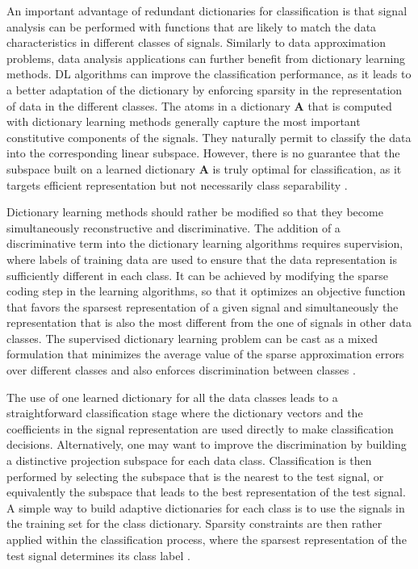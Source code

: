 An important advantage of redundant dictionaries for classification is that signal analysis can be performed with functions that are likely to match the data characteristics in different classes of signals. Similarly to data approximation problems, data analysis applications can further benefit from dictionary learning methods. DL algorithms can improve the classification performance, as it leads to a better adaptation of the dictionary by enforcing sparsity in the representation of data in the different classes. The atoms in a dictionary $\textbf{A}$ that is computed with dictionary learning methods generally capture the most important constitutive components of the signals. They naturally permit to classify the data into the corresponding linear subspace. However, there is no guarantee that the subspace built on a learned dictionary $\textbf{A}$ is truly optimal for classification, as it targets efficient representation but not necessarily class separability \cite{tosic2011dictionary}.

Dictionary learning methods should rather be modified so that they become simultaneously reconstructive and discriminative. The addition of a discriminative term into the dictionary learning algorithms requires supervision, where labels of training data are used to ensure that the data representation is sufficiently different in each class. It can be achieved by modifying the sparse coding step in the learning algorithms, so that it optimizes an objective function that favors the sparsest representation of a given signal and simultaneously the representation that is also the most different from the one of signals in other data classes. The supervised dictionary learning problem can be cast as a mixed formulation that minimizes the average value of the sparse approximation errors over different classes and also enforces discrimination between classes \cite{tosic2011dictionary}.

The use of one learned dictionary for all the data classes leads to a straightforward classification stage where the dictionary vectors and the coefficients in the signal representation are used directly to make classification decisions. Alternatively, one may want to improve the discrimination by building a distinctive projection subspace for each data class. Classification is then performed by selecting the subspace that is the nearest to the test signal, or equivalently the subspace that leads to the best representation of the test signal. A simple way to build adaptive dictionaries for each class is to use the signals in the training set for the class dictionary. Sparsity constraints are then rather applied within the classification process, where the sparsest representation of the test signal determines its class label \cite{tosic2011dictionary}.

